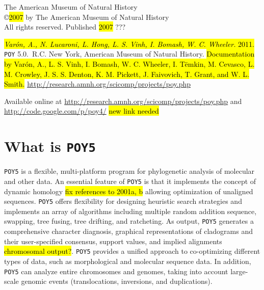 \documentclass[11pt]{book}
\newcommand{\commandstyle}[1]{\texttt{#1}}
\newcommand{\poy}{\commandstyle{POY5}\xspace}
\begin{document}
\begin{flushleft}
\vspace*{0.25cm}
The American Museum of Natural History\\
\copyright \hl {2007} by The American Museum of Natural History \\
All rights reserved. Published \hl{2007} ???

\vspace*{0.25cm}
\hl{
\emph{Var\'on, A., N. Lucaroni, L. Hong, L. S. Vinh, I. Bomash, W. C. Wheeler.} 2011.}
\texttt{POY} 5.0.\buildnumber\ R.C. New York, American Museum of
Natural History. \hl{Documentation by Var\'on, A., L. S. Vinh, I. Bomash,
W. C. Wheeler, I. T\"emkin, M. Cevasco, L. M. Crowley, J. S. S. Denton, K. M. Pickett, J. Faivovich, T. Grant, and
W. L. Smith.} \url{http://research.amnh.org/scicomp/projects/poy.php}

\vspace*{0.5cm}

Available online at
\url{http://research.amnh.org/scicomp/projects/poy.php}
and
\url{http://code.google.com/p/poy4/} 
\hl{new link needed}

\end{flushleft}

\tableofcontents


\chapter{What is \poy}

\poy is a flexible, multi-platform program for phylogenetic analysis of molecular and other data. %
An essential feature of \poy is that it implements the concept of dynamic homology \cite{wheeler2001a, wheeler2001} \hl{fix references to 2001a, b} allowing optimization of unaligned sequences. \poy offers flexibility for designing heuristic search strategies and implements an array of algorithms including multiple random addition sequence, swapping, tree fusing, tree drifting, and ratcheting. As output, \poy generates a comprehensive character diagnosis, graphical representations of cladograms and their user-specified consensus, support values, and implied alignments \hl{chromosomal output?}. \poy provides a unified approach to co-optimizing different types of data, such as morphological and molecular sequence data. In addition, \poy can analyze entire chromosomes and genomes, taking into account large-scale genomic events (translocations, inversions, and duplications).
\end{document}
